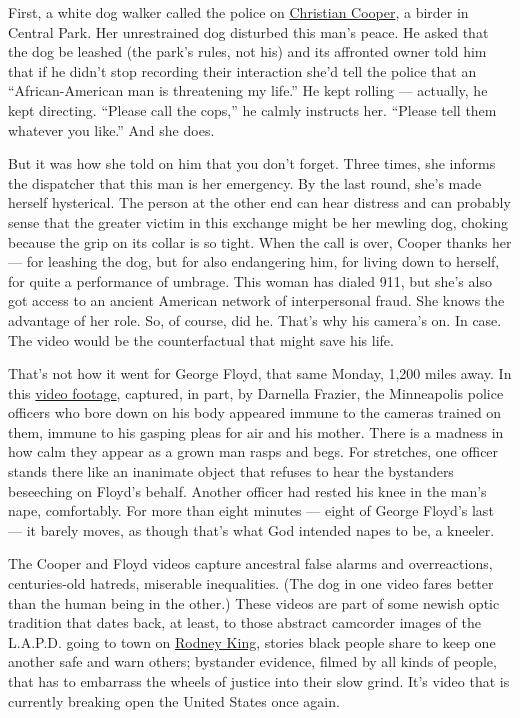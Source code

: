 First, a white dog walker called the police on
\href{https://www.nytimes3xbfgragh.onion/2020/05/27/nyregion/amy-cooper-christian-central-park-video.html}{Christian
Cooper}, a birder in Central Park. Her unrestrained dog disturbed this
man's peace. He asked that the dog be leashed (the park's rules, not
his) and its affronted owner told him that if he didn't stop recording
their interaction she'd tell the police that an ``African-American man
is threatening my life.'' He kept rolling --- actually, he kept
directing. ``Please call the cops,'' he calmly instructs her. ``Please
tell them whatever you like.'' And she does.

But it was how she told on him that you don't forget. Three times, she
informs the dispatcher that this man is her emergency. By the last
round, she's made herself hysterical. The person at the other end can
hear distress and can probably sense that the greater victim in this
exchange might be her mewling dog, choking because the grip on its
collar is so tight. When the call is over, Cooper thanks her --- for
leashing the dog, but for also endangering him, for living down to
herself, for quite a performance of umbrage. This woman has dialed 911,
but she's also got access to an ancient American network of
interpersonal fraud. She knows the advantage of her role. So, of course,
did he. That's why his camera's on. In case. The video would be the
counterfactual that might save his life.

That's not how it went for George Floyd, that same Monday, 1,200 miles
away. In this
\href{https://www.nytimes3xbfgragh.onion/2020/05/31/us/george-floyd-investigation.html}{video
footage}, captured, in part, by Darnella Frazier, the Minneapolis police
officers who bore down on his body appeared immune to the cameras
trained on them, immune to his gasping pleas for air and his mother.
There is a madness in how calm they appear as a grown man rasps and
begs. For stretches, one officer stands there like an inanimate object
that refuses to hear the bystanders beseeching on Floyd's behalf.
Another officer had rested his knee in the man's nape, comfortably. For
more than eight minutes --- eight of George Floyd's last --- it barely
moves, as though that's what God intended napes to be, a kneeler.

The Cooper and Floyd videos capture ancestral false alarms and
overreactions, centuries-old hatreds, miserable inequalities. (The dog
in one video fares better than the human being in the other.) These
videos are part of some newish optic tradition that dates back, at
least, to those abstract camcorder images of the L.A.P.D. going to town
on
\href{https://www.nytimes3xbfgragh.onion/1991/03/18/us/seven-minutes-los-angeles-special-report-videotaped-beating-officers-puts-full.html}{Rodney
King}, stories black people share to keep one another safe and warn
others; bystander evidence, filmed by all kinds of people, that has to
embarrass the wheels of justice into their slow grind. It's video that
is currently breaking open the United States once again.

